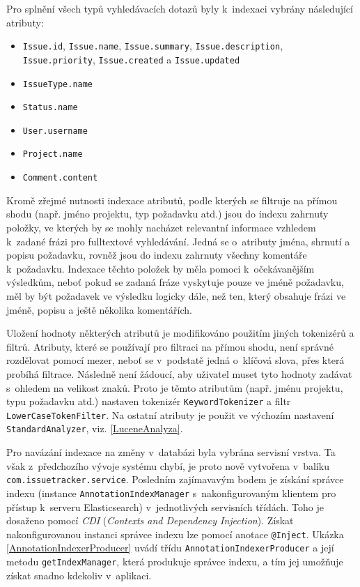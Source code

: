 \documentclass[11pt,oneside]{fithesis2}
\begin{document}
Pro splnění všech typů vyhledávacích dotazů byly k~indexaci vybrány následující atributy:
\begin{itemize}
	\item \texttt{Issue.id}, \texttt{Issue.name}, \texttt{Issue.summary}, \texttt{Issue.description}, \\ \texttt{Issue.priority}, \texttt{Issue.created} a \texttt{Issue.updated}
	\item \texttt{IssueType.name}
	\item \texttt{Status.name}
	\item \texttt{User.username}
	\item \texttt{Project.name}
	\item \texttt{Comment.content}
\end{itemize}

Kromě zřejmé nutnosti indexace atributů, podle kterých se filtruje na přímou shodu (např. jméno projektu, typ požadavku atd.) jsou do indexu zahrnuty položky, ve kterých by se mohly nacházet relevantní informace vzhledem k~zadané frázi pro fulltextové vyhledávání. Jedná se o~atributy jména, shrnutí a popisu požadavku, rovněž jsou do indexu zahrnuty všechny komentáře k~požadavku. Indexace těchto položek by měla pomoci k~očekávanějším výsledkům, neboť pokud se zadaná fráze vyskytuje pouze ve jméně požadavku, měl by být požadavek ve výsledku logicky dále, než ten, který obsahuje frázi ve jméně, popisu a ještě několika komentářích.

Uložení hodnoty některých atributů je modifikováno použitím jiných tokenizérů a filtrů. Atributy, které se používají pro filtraci na přímou shodu, není správné rozdělovat pomocí mezer, neboť se v~podstatě jedná o~klíčová slova, přes která probíhá filtrace. Následně není žádoucí, aby uživatel muset tyto hodnoty zadávat s~ohledem na velikost znaků. Proto je těmto atributům (např. jménu projektu, typu požadavku atd.) nastaven tokenizér \texttt{KeywordTokenizer} a filtr \texttt{LowerCaseTokenFilter}. Na ostatní atributy je použit ve výchozím nastavení \texttt{StandardAnalyzer}, viz. \ref{LuceneAnalyza}.

Pro navázání indexace na změny v~databázi byla vybrána servisní vrstva. Ta však z~předchozího vývoje systému chybí, je proto nově vytvořena v~balíku \texttt{com.issuetracker.service}. Posledním zajímavavým bodem je získání správce indexu (instance \texttt{AnnotationIndexManager} s~nakonfigurovaným klientem pro přístup k~serveru Elasticsearch) v~jednotlivých servisních třídách. Toho je dosaženo pomocí \emph{CDI} (\emph{Contexts and Dependency Injection}). Získat nakonfigurovanou instanci správce indexu lze pomocí anotace \texttt{@Inject}. Ukázka \ref{AnnotationIndexerProducer} uvádí třídu \texttt{AnnotationIndexerProducer} a její metodu \texttt{getIndexManager}, která produkuje správce indexu, a tím jej umožňuje získat snadno kdekoliv v~aplikaci.
\end{document}
